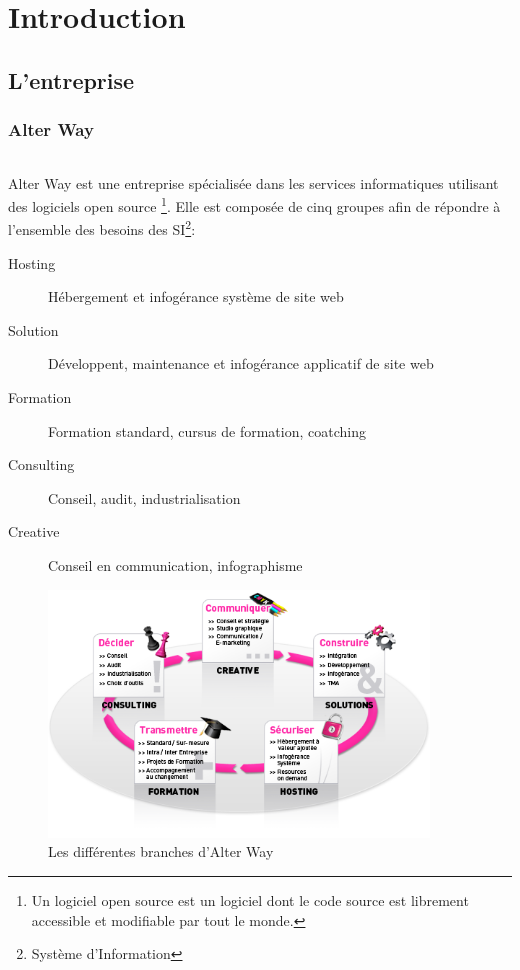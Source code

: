 


\part{Introduction}
\chapter{L'entreprise}
\section{Alter Way}
\paragraph*{}
	Alter Way est une entreprise spécialisée dans les services informatiques utilisant des logiciels open source
	\footnote{Un logiciel open source est un logiciel dont le code source est librement accessible et modifiable par tout le monde.}.
	Elle est composée de cinq groupes afin de répondre à l'ensemble des besoins des SI\footnote{Système d'Information}:
	\begin{description}
		\item[Hosting] Hébergement et infogérance système de site web
		\item[Solution] Développent, maintenance et infogérance applicatif de site web
		\item[Formation] Formation standard, cursus de formation, coatching
		\item[Consulting] Conseil, audit, industrialisation
		\item[Creative] Conseil en communication, infographisme
	\end{description}

	\begin{figure}
	\centering
	\includegraphics[width=0.9\textwidth]{resource/img/aw_360}
	\caption{Les différentes branches d'Alter Way}
	\end{figure}

